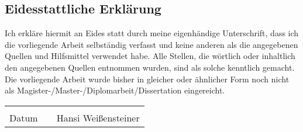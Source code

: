 \subsection*{Eidesstattliche Erkl\"arung}

Ich erkl\"are hiermit an Eides statt durch meine eigenh\"andige Unterschrift, dass ich die vorliegende Arbeit selbst\"andig verfasst und keine anderen als die angegebenen Quellen und Hilfsmittel verwendet habe. Alle Stellen, die w\"ortlich oder inhaltlich den angegebenen Quellen entnommen wurden, sind als solche kenntlich gemacht.
Die vorliegende Arbeit wurde bisher in gleicher oder \"ahnlicher Form noch nicht als Magister-/Master-/Diplomarbeit/Dissertation eingereicht. 


\vspace*{3cm}

\begin{tabular}{ccc}
\hspace*{4cm} & \hspace*{4cm} & \hspace*{4cm}\\\cline{1-1}\cline{3-3} 
Datum & & Hansi Wei\ss{}ensteiner\\
\end{tabular}